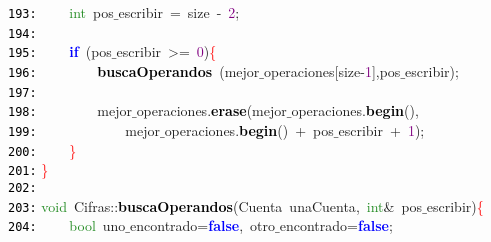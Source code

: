 \documentclass[a4paper,10pt]{scrartcl}
\begin{document}
{   \mbox{}\texttt{\textcolor{Black}{193:}} \ \ \ \ \textcolor{ForestGreen}{int}\ pos$\_$escribir\ \textcolor{BrickRed}{=}\ size\ \textcolor{BrickRed}{-}\ \textcolor{Purple}{2}\textcolor{BrickRed}{;} \\
   \mbox{}\texttt{\textcolor{Black}{194:}} \ \ \ \  \\
   \mbox{}\texttt{\textcolor{Black}{195:}} \ \ \ \ \textbf{\textcolor{Blue}{if}}\ \textcolor{BrickRed}{(}pos$\_$escribir\ \textcolor{BrickRed}{\textgreater{}=}\ \textcolor{Purple}{0}\textcolor{BrickRed}{)}\textcolor{Red}{\{} \\
   \mbox{}\texttt{\textcolor{Black}{196:}} \ \ \ \ \ \ \ \ \textbf{\textcolor{Black}{buscaOperandos}}\ \textcolor{BrickRed}{(}mejor$\_$operaciones\textcolor{BrickRed}{[}size\textcolor{BrickRed}{-}\textcolor{Purple}{1}\textcolor{BrickRed}{],}pos$\_$escribir\textcolor{BrickRed}{);} \\
   \mbox{}\texttt{\textcolor{Black}{197:}} \ \  \\
   \mbox{}\texttt{\textcolor{Black}{198:}} \ \ \ \ \ \ \ \ mejor$\_$operaciones\textcolor{BrickRed}{.}\textbf{\textcolor{Black}{erase}}\textcolor{BrickRed}{(}mejor$\_$operaciones\textcolor{BrickRed}{.}\textbf{\textcolor{Black}{begin}}\textcolor{BrickRed}{(),} \\
   \mbox{}\texttt{\textcolor{Black}{199:}} \ \ \ \ \ \ \ \ \ \ \ \  mejor$\_$operaciones\textcolor{BrickRed}{.}\textbf{\textcolor{Black}{begin}}\textcolor{BrickRed}{()}\ \textcolor{BrickRed}{+}\ pos$\_$escribir\ \textcolor{BrickRed}{+}\ \textcolor{Purple}{1}\textcolor{BrickRed}{);}\ \ \  \\
   \mbox{}\texttt{\textcolor{Black}{200:}} \ \ \ \ \textcolor{Red}{\}} \\
   \mbox{}\texttt{\textcolor{Black}{201:}} \textcolor{Red}{\}} \\
   \mbox{}\texttt{\textcolor{Black}{202:}}  \\
   \mbox{}\texttt{\textcolor{Black}{203:}} \textcolor{ForestGreen}{void}\ Cifras\textcolor{BrickRed}{::}\textbf{\textcolor{Black}{buscaOperandos}}\textcolor{BrickRed}{(}\textcolor{TealBlue}{Cuenta}\ unaCuenta\textcolor{BrickRed}{,}\ \textcolor{ForestGreen}{int}\textcolor{BrickRed}{\&}\ pos$\_$escribir\textcolor{BrickRed}{)}\textcolor{Red}{\{} \\
   \mbox{}\texttt{\textcolor{Black}{204:}} \ \ \ \ \textcolor{ForestGreen}{bool}\ uno$\_$encontrado\textcolor{BrickRed}{=}\textbf{\textcolor{Blue}{false}}\textcolor{BrickRed}{,}\ otro$\_$encontrado\textcolor{BrickRed}{=}\textbf{\textcolor{Blue}{false}}\textcolor{BrickRed}{;} \\
}
\end{document}

